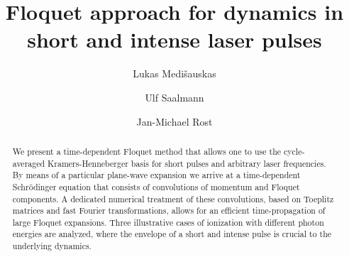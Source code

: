 \documentclass[
pra%
,preprint%
,amssymb, nobibnotes, aps, superscriptaddress, floatfix]{revtex4}
\begin{document}
\title[]{Floquet approach for dynamics in short and intense laser pulses}

\author{Lukas Medi\v sauskas}
\author{Ulf Saalmann}
\author{Jan-Michael Rost }

\begin{abstract}
We present a time-dependent Floquet method that allows one to use the cycle-averaged Kramers-Henneberger basis for short pulses and arbitrary laser frequencies.
By means of a particular plane-wave expansion we arrive at a time-dependent Schr\"{o}dinger equation that consists of convolutions of momentum and Floquet components. A dedicated numerical treatment of these convolutions, based on Toeplitz matrices and fast Fourier transformations, allows for an efficient time-propagation of large Floquet expansions. 
Three illustrative cases of ionization with different photon energies are analyzed, where the envelope of a short and intense pulse is crucial to the underlying dynamics.

%
%
%

\end{abstract}
\end{document}
